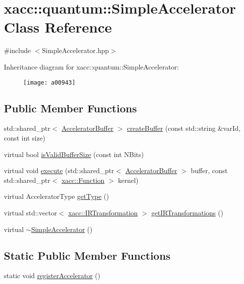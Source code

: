 \hypertarget{a00943}{}\section{xacc\+:\+:quantum\+:\+:Simple\+Accelerator Class Reference}
\label{a00943}


{\ttfamily \#include $<$Simple\+Accelerator.\+hpp$>$}

Inheritance diagram for xacc\+:\+:quantum\+:\+:Simple\+Accelerator\+:\begin{figure}[H]
\begin{center}
\leavevmode
\texttt{[image: a00943]}
\end{center}
\end{figure}
\subsection*{Public Member Functions}
\begin{DoxyCompactItemize}
\item 
std\+::shared\+\_\+ptr$<$ \hyperlink{a01099}{Accelerator\+Buffer} $>$ \hyperlink{a00943_adb9393692e9f484df241aa5d014030d1}{create\+Buffer} (const std\+::string \&var\+Id, const int size)
\item 
virtual bool \hyperlink{a00943_a60b9db2d6aed235857c45413a070338e}{is\+Valid\+Buffer\+Size} (const int N\+Bits)
\item 
virtual void \hyperlink{a00943_a3089b15fbbaa83abf2941bd3b8d2d3c6}{execute} (std\+::shared\+\_\+ptr$<$ \hyperlink{a01099}{Accelerator\+Buffer} $>$ buffer, const std\+::shared\+\_\+ptr$<$ \hyperlink{a01127}{xacc\+::\+Function} $>$ kernel)
\item 
virtual Accelerator\+Type \hyperlink{a00943_ad76eeb0bbd7de21aad5bd20d20970a98}{get\+Type} ()
\item 
virtual std\+::vector$<$ \hyperlink{a01155}{xacc\+::\+I\+R\+Transformation} $>$ \hyperlink{a00943_afc49c9e7973ba6c6ff9761c36198323d}{get\+I\+R\+Transformations} ()
\item 
virtual \hyperlink{a00943_a7ff286def924fafdff2066d12858e60c}{$\sim$\+Simple\+Accelerator} ()
\end{DoxyCompactItemize}
\subsection*{Static Public Member Functions}
\begin{DoxyCompactItemize}
\item 
static void \hyperlink{a00943_a1cfa3381a56ca6f431b4722162ccb63d}{register\+Accelerator} ()
\end{DoxyCompactItemize}
